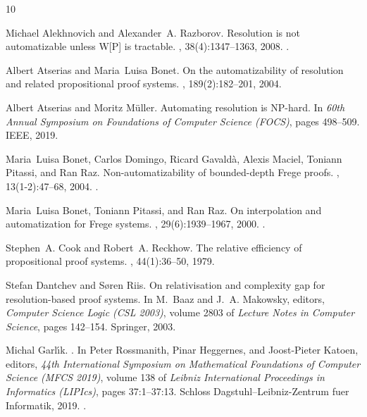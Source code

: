 \documentclass[10pt,a4paper]{article}
\theoremstyle{remark}
\newtheorem*{switching lemma}{Switching Lemma}
\newtheorem*{open problem}{Open Problem}
\theoremstyle{definition}
\begin{document}
\begin{thebibliography}{10}

Michael Alekhnovich and Alexander~A. Razborov.
\newblock Resolution is not automatizable unless {W[P]} is tractable.
, 38(4):1347--1363, 2008.
\newblock \href {http://dx.doi.org/10.1137/06066850X}
  {}.

Albert Atserias and Maria~Luisa Bonet.
\newblock On the automatizability of resolution and related propositional proof
  systems.
, 189(2):182--201, 2004.

Albert Atserias and Moritz M{\"u}ller.
\newblock Automating resolution is {NP}-hard.
\newblock In {\em 60th Annual Symposium on Foundations of Computer Science
  (FOCS)}, pages 498--509. IEEE, 2019.

Maria~Luisa Bonet, Carlos Domingo, Ricard Gavald\`a, Alexis Maciel, Toniann
  Pitassi, and Ran Raz.
\newblock Non-automatizability of bounded-depth {F}rege proofs.
, 13(1-2):47--68, 2004.
\newblock \href {http://dx.doi.org/10.1007/s00037-004-0183-5}
  {}.

Maria~Luisa Bonet, Toniann Pitassi, and Ran Raz.
\newblock On interpolation and automatization for {F}rege systems.
, 29(6):1939--1967, 2000.
\newblock \href {http://dx.doi.org/10.1137/S0097539798353230}
  {}.

Stephen~A. Cook and Robert~A. Reckhow.
\newblock The relative efficiency of propositional proof systems.
, 44(1):36--50, 1979.

Stefan Dantchev and S{\o}ren Riis.
\newblock On relativisation and complexity gap for resolution-based proof
  systems.
\newblock In M.~Baaz and J.~A. Makowsky, editors, {\em Computer Science Logic
  (CSL 2003)}, volume 2803 of {\em Lecture Notes in Computer Science}, pages
  142--154. Springer, 2003.

Michal Garl{\'\i}k.
.
\newblock In Peter Rossmanith, Pinar Heggernes, and Joost-Pieter Katoen,
  editors, {\em 44th International Symposium on Mathematical Foundations of
  Computer Science (MFCS 2019)}, volume 138 of {\em Leibniz International
  Proceedings in Informatics (LIPIcs)}, pages 37:1--37:13. Schloss
  Dagstuhl--Leibniz-Zentrum fuer Informatik, 2019.
\newblock \href {http://dx.doi.org/10.4230/LIPIcs.MFCS.2019.37}
  {}.


\end{thebibliography}
\end{document}
